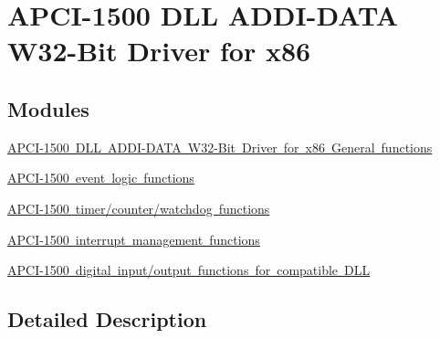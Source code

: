 \hypertarget{group___general_cmp_d_l_l}{}\section{A\+P\+C\+I-\/1500 D\+LL A\+D\+D\+I-\/\+D\+A\+TA W32-\/\+Bit Driver for x86}
\label{group___general_cmp_d_l_l}
\subsection*{Modules}
\begin{DoxyCompactItemize}
\item 
\mbox{\hyperlink{group___general_functions}{A\+P\+C\+I-\/1500 D\+L\+L A\+D\+D\+I-\/\+D\+A\+T\+A W32-\/\+Bit Driver for x86 General functions}}
\item 
\mbox{\hyperlink{group___event_cmp_d_l_l}{A\+P\+C\+I-\/1500 event logic functions}}
\item 
\mbox{\hyperlink{group___timer_cmp_d_l_l}{A\+P\+C\+I-\/1500 timer/counter/watchdog functions}}
\item 
\mbox{\hyperlink{group___interrupt_cmp_d_l_l}{A\+P\+C\+I-\/1500 interrupt management functions}}
\item 
\mbox{\hyperlink{group___dig_i_o_cmp_d_l_l}{A\+P\+C\+I-\/1500 digital input/output functions for compatible D\+LL}}
\end{DoxyCompactItemize}


\subsection{Detailed Description}
